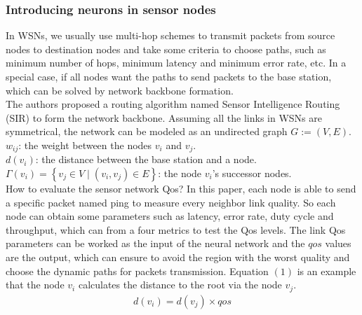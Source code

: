 \documentclass[11pt]{report}
\begin{document}
	\subsubsection{Introducing neurons in sensor nodes}
	In WSNs, we usually use multi-hop schemes to transmit packets from source nodes to destination nodes and take some criteria to choose paths, such as minimum number of hops, minimum latency and minimum error rate, etc. In a special case, if all nodes want the paths to send packets to the base station, which can be solved by network backbone formation.\\
	
	\noindent The authors proposed a routing algorithm named Sensor Intelligence Routing (SIR) to form the network backbone. Assuming all the links in WSNs are symmetrical, the network can be modeled as an undirected graph $G:=\left(V,E\right)$. \\
	$w_{ij}$: the weight between the nodes $v_i$ and $v_j$.\\
	$d\left(v_i\right)$: the distance between the base station and a node.\\
	$\Gamma\left(v_i\right)=\left\{v_j\in V\mid\left(v_i,v_j\right)\in E\right\}$: the node $v_i$'s successor nodes.\\
	
	\noindent How to evaluate the sensor network Qos? In this paper, each node is able to send a specific packet named ping to measure every neighbor link quality. So each node can obtain some parameters such as latency, error rate, duty cycle and throughput, which can from a four metrics to test the Qos levels. The link Qos parameters can be worked as the input of the neural network and the $qos$ values are the output, which can ensure to avoid the region with the worst quality and choose the dynamic paths for packets transmission. Equation $\left(1\right)$ is an example that the node $v_i$ calculates the distance to the root via the node $v_j$.\\ 
 	\begin{eqnarray}
 	d\left(v_i\right) = d\left(v_j\right)\times qos
 	\end{eqnarray}
	
\end{document}
